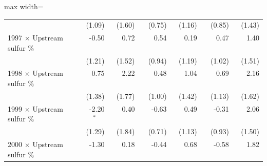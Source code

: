 \begin{table}[htbp]
{\begin{adjustbox}{max width=\linewidth}
\begin{tabular}{lrrrrrr}
 & (\phantom{-}1.09)\phantom{$^{***}$} & (\phantom{-}1.60)\phantom{$^{***}$} & (\phantom{-}0.75)\phantom{$^{***}$} & (\phantom{-}1.16)\phantom{$^{***}$} & (\phantom{-}0.85)\phantom{$^{***}$} & (\phantom{-}1.43)\phantom{$^{***}$} \\
1997 $\times$ Upstream sulfur \% & \phantom{(}-0.50$^{\phantom{*}\phantom{*}\phantom{*}}$ & \phantom{(}\phantom{-}0.72$^{\phantom{*}\phantom{*}\phantom{*}}$ & \phantom{(}\phantom{-}0.54$^{\phantom{*}\phantom{*}\phantom{*}}$ & \phantom{(}\phantom{-}0.19$^{\phantom{*}\phantom{*}\phantom{*}}$ & \phantom{(}\phantom{-}0.47$^{\phantom{*}\phantom{*}\phantom{*}}$ & \phantom{(}\phantom{-}1.40$^{\phantom{*}\phantom{*}\phantom{*}}$ \\
 & (\phantom{-}1.21)\phantom{$^{***}$} & (\phantom{-}1.52)\phantom{$^{***}$} & (\phantom{-}0.94)\phantom{$^{***}$} & (\phantom{-}1.19)\phantom{$^{***}$} & (\phantom{-}1.02)\phantom{$^{***}$} & (\phantom{-}1.51)\phantom{$^{***}$} \\
1998 $\times$ Upstream sulfur \% & \phantom{(}\phantom{-}0.75$^{\phantom{*}\phantom{*}\phantom{*}}$ & \phantom{(}\phantom{-}2.22$^{\phantom{*}\phantom{*}\phantom{*}}$ & \phantom{(}\phantom{-}0.48$^{\phantom{*}\phantom{*}\phantom{*}}$ & \phantom{(}\phantom{-}1.04$^{\phantom{*}\phantom{*}\phantom{*}}$ & \phantom{(}\phantom{-}0.69$^{\phantom{*}\phantom{*}\phantom{*}}$ & \phantom{(}\phantom{-}2.16$^{\phantom{*}\phantom{*}\phantom{*}}$ \\
 & (\phantom{-}1.38)\phantom{$^{***}$} & (\phantom{-}1.77)\phantom{$^{***}$} & (\phantom{-}1.00)\phantom{$^{***}$} & (\phantom{-}1.42)\phantom{$^{***}$} & (\phantom{-}1.13)\phantom{$^{***}$} & (\phantom{-}1.62)\phantom{$^{***}$} \\
1999 $\times$ Upstream sulfur \% & \phantom{(}-2.20$^{*\phantom{*}\phantom{*}}$ & \phantom{(}\phantom{-}0.40$^{\phantom{*}\phantom{*}\phantom{*}}$ & \phantom{(}-0.63$^{\phantom{*}\phantom{*}\phantom{*}}$ & \phantom{(}\phantom{-}0.49$^{\phantom{*}\phantom{*}\phantom{*}}$ & \phantom{(}-0.31$^{\phantom{*}\phantom{*}\phantom{*}}$ & \phantom{(}\phantom{-}2.06$^{\phantom{*}\phantom{*}\phantom{*}}$ \\
 & (\phantom{-}1.29)\phantom{$^{***}$} & (\phantom{-}1.84)\phantom{$^{***}$} & (\phantom{-}0.71)\phantom{$^{***}$} & (\phantom{-}1.13)\phantom{$^{***}$} & (\phantom{-}0.93)\phantom{$^{***}$} & (\phantom{-}1.50)\phantom{$^{***}$} \\
2000 $\times$ Upstream sulfur \% & \phantom{(}-1.30$^{\phantom{*}\phantom{*}\phantom{*}}$ & \phantom{(}\phantom{-}0.18$^{\phantom{*}\phantom{*}\phantom{*}}$ & \phantom{(}-0.44$^{\phantom{*}\phantom{*}\phantom{*}}$ & \phantom{(}\phantom{-}0.68$^{\phantom{*}\phantom{*}\phantom{*}}$ & \phantom{(}-0.58$^{\phantom{*}\phantom{*}\phantom{*}}$ & \phantom{(}\phantom{-}1.82$^{\phantom{*}\phantom{*}\phantom{*}}$ \\

\end{tabular}
\end{adjustbox}}
\end{table}
